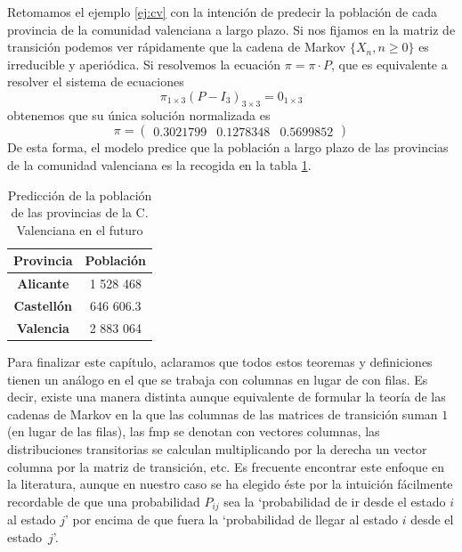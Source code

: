 \begin{ejemplo}
    \label{ej:cv2}
    Retomamos el ejemplo \ref{ej:cv} con la intención de predecir la población de cada provincia de la comunidad valenciana a largo plazo. Si nos fijamos en la matriz de transición podemos ver rápidamente que la cadena de Markov $\{X_n,n\geq 0\}$ es irreducible y aperiódica. Si resolvemos la ecuación $\pi=\pi \cdot P$, que es equivalente a resolver el sistema de ecuaciones 
    \begin{equation*}
        \pi_{1\times 3} (P-I_3)_{3\times 3} = 0_{1\times 3} 
    \end{equation*}
    obtenemos que su única solución normalizada es 
    \begin{equation*}
        \pi = \begin{pmatrix}
            0.3021799 & 0.1278348 & 0.5699852
        \end{pmatrix}
    \end{equation*}
    De esta forma, el modelo predice que la población a largo plazo de las provincias de la comunidad valenciana es la recogida en la tabla \ref{tab:poblacion-largo-plazo}.
    \begin{table}[h]
        \centering
        \begin{tabular}{cc}\hline
            \textbf{Provincia}  & \textbf{Población} \\ \hline\hline
            \textbf{Alicante} &  1 528 468 \\ \hline
            \textbf{Castellón} & 646 606.3 \\ \hline
            \textbf{Valencia} & 2 883 064 \\ \hline
        \end{tabular}
        \caption{Predicción de la población de las provincias de la C. Valenciana en el futuro}
        \label{tab:poblacion-largo-plazo}
    \end{table}
\end{ejemplo}

Para finalizar este capítulo, aclaramos que todos estos teoremas y definiciones tienen un análogo en el que se trabaja con columnas en lugar de con filas. Es decir, existe una manera distinta aunque equivalente de formular la teoría de las cadenas de Markov en la que las columnas de las matrices de transición suman $1$ (en lugar de las filas), las fmp se denotan con vectores columnas, las distribuciones transitorias se calculan multiplicando por la derecha un vector columna por la matriz de transición, etc. Es frecuente encontrar este enfoque en la literatura, aunque en nuestro caso se ha elegido éste por la intuición fácilmente recordable de que una probabilidad $P_{ij}$ sea la `probabilidad de ir desde el estado $i$ al estado $j$' por encima de que fuera la `probabilidad de llegar al estado $i$ desde el estado~$j$'. 